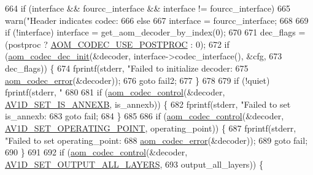 \begin{DoxyCodeInclude}
{{{{{{{{{{{{{{{{{{{{{{{{{{{{{{664   \textcolor{keywordflow}{if} (interface && fourcc\_interface && interface != fourcc\_interface)
665     warn(\textcolor{stringliteral}{"Header indicates codec: %
666   \textcolor{keywordflow}{else}
667     \textcolor{keyword}{interface }= fourcc\_interface;
668 
669   \textcolor{keywordflow}{if} (!interface) \textcolor{keyword}{interface }= get\_aom\_decoder\_by\_index(0);
670 
671   dec\_flags = (postproc ? \hyperlink{group__decoder_ga7b6c145833964c9edd3ff78be017f7ec}{AOM\_CODEC\_USE\_POSTPROC} : 0);
672   \textcolor{keywordflow}{if} (\hyperlink{group__decoder_gafdbfca65b19ab1f6d72b32cd01753b9b}{aom\_codec\_dec\_init}(&decoder, interface->codec\_interface(), &cfg,
673                          dec\_flags)) \{
674     fprintf(stderr, \textcolor{stringliteral}{"Failed to initialize decoder: %
675             \hyperlink{group__codec_ga50949c0854605c722832bbfb0803f5f4}{aom\_codec\_error}(&decoder));
676     \textcolor{keywordflow}{goto} fail2;
677   \}
678 
679   \textcolor{keywordflow}{if} (!quiet) fprintf(stderr, \textcolor{stringliteral}{"%
680 
681   \textcolor{keywordflow}{if} (\hyperlink{group__codec_ga6da974f4eeaba1fa74106b28d0fe6ac5}{aom\_codec\_control}(&decoder, \hyperlink{group__aom__decoder_gga3865fd4b3192489baa9a5c3632ebe97ba1fb269c5c5913d9995b6c35d28e2a788}{AV1D\_SET\_IS\_ANNEXB}, is\_annexb)) \{
682     fprintf(stderr, \textcolor{stringliteral}{"Failed to set is\_annexb: %
683     \textcolor{keywordflow}{goto} fail;
684   \}
685 
686   \textcolor{keywordflow}{if} (\hyperlink{group__codec_ga6da974f4eeaba1fa74106b28d0fe6ac5}{aom\_codec\_control}(&decoder, \hyperlink{group__aom__decoder_gga3865fd4b3192489baa9a5c3632ebe97baa8b955fc5a2f6e33c6dad858d7c15f67}{AV1D\_SET\_OPERATING\_POINT}, 
      operating\_point)) \{
687     fprintf(stderr, \textcolor{stringliteral}{"Failed to set operating\_point: %
688             \hyperlink{group__codec_ga50949c0854605c722832bbfb0803f5f4}{aom\_codec\_error}(&decoder));
689     \textcolor{keywordflow}{goto} fail;
690   \}
691 
692   \textcolor{keywordflow}{if} (\hyperlink{group__codec_ga6da974f4eeaba1fa74106b28d0fe6ac5}{aom\_codec\_control}(&decoder, \hyperlink{group__aom__decoder_gga3865fd4b3192489baa9a5c3632ebe97ba8d51f96b8877b665225f5cfaa73ded8e}{AV1D\_SET\_OUTPUT\_ALL\_LAYERS},
693                         output\_all\_layers)) \{
}}}}}}}}}}}}}}}}}}}}}}}}}}}}}}}}}}}
\end{DoxyCodeInclude}
